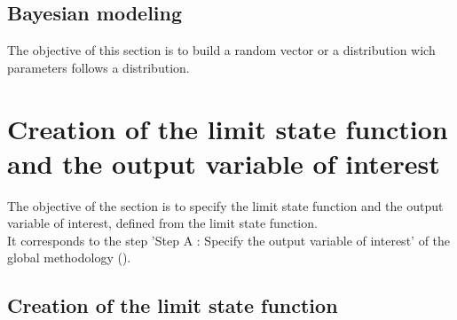 
\newpage 
\newpage 
\newpage 
\newpage 
\newpage 
\newpage 
\newpage 
\newpage 
\newpage 
\newpage 
\newpage 
\newpage 
\newpage 
\newpage 
\newpage 




\newpage \subsection{Bayesian modeling}

The objective of this section is to build a random vector or a distribution wich parameters follows a distribution.


\newpage 
\newpage 


\newpage \section{Creation of the limit state function and the output variable of interest}


The objective of the section is to specify the limit state function and the output variable of interest, defined from the limit state function.\\
It corresponds to the step 'Step A : Specify the output variable of interest' of the global methodology
().


\subsection{Creation of the limit state function}
\label{sec:LSFcreation}

